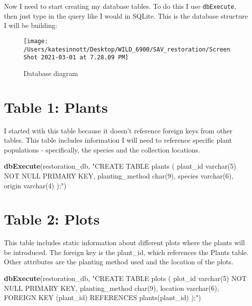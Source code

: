 \documentclass[
]{book}
\newenvironment{Shaded}{\begin{snugshade}}{\end{snugshade}}
\newcommand{\KeywordTok}[1]{\textcolor[rgb]{0.13,0.29,0.53}{\textbf{#1}}}
\newcommand{\NormalTok}[1]{#1}
\newcommand{\StringTok}[1]{\textcolor[rgb]{0.31,0.60,0.02}{#1}}
\begin{document}
Now I need to start creating my database tables. To do this I use \texttt{dbExecute}, then
just type in the query like I would in SQLite. This is the database structure I will
be building:

\begin{figure}

{\centering \texttt{[image: /Users/katesinnott/Desktop/WILD\_6900/SAV\_restoration/Screen Shot 2021-03-01 at 7.28.09 PM]} 

}

\caption{Database diagram}\label{fig:diagram}
\end{figure}

\hypertarget{table-1-plants}{%
\section{Table 1: Plants}\label{table-1-plants}}

I started with this table because it doesn't reference foreign keys from other tables. This table includes information I will need to reference specific plant populations -
specifically, the species and the collection locations.

\begin{Shaded}
\begin{Highlighting}[]
\KeywordTok{dbExecute}\NormalTok{(restoration_db, }\StringTok{"CREATE TABLE plants (}
\StringTok{          plant_id varchar(5) NOT NULL PRIMARY KEY,}
\StringTok{          planting_method char(9),}
\StringTok{          species varchar(6),}
\StringTok{          origin varchar(4)}
\StringTok{          );"}\NormalTok{)}
\end{Highlighting}
\end{Shaded}

\hypertarget{table-2-plots}{%
\section{Table 2: Plots}\label{table-2-plots}}

This table includes static information about different plots where the plants will be introduced. The foreign key is the plant\_id, which references the Plants table. Other attributes are the planting method used and the location of the plots.

\begin{Shaded}
\begin{Highlighting}[]
\KeywordTok{dbExecute}\NormalTok{(restoration_db, }\StringTok{"CREATE TABLE plots (}
\StringTok{          plot_id varchar(5) NOT NULL PRIMARY KEY,}
\StringTok{          planting_method char(9),}
\StringTok{          location varchar(6), }
\StringTok{          FOREIGN KEY (plant_id) REFERENCES plants(plant_id)}
\StringTok{          );"}\NormalTok{)}
\end{Highlighting}
\end{Shaded}
\end{document}
